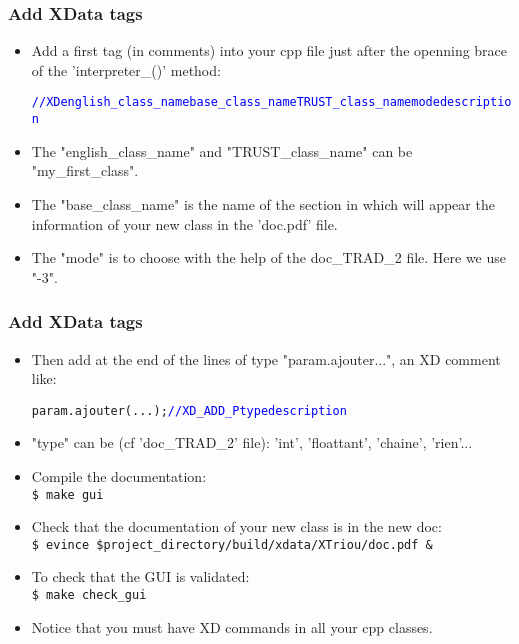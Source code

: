 \documentclass[10pt, hyperref={unicode=true,pdfusetitle, bookmarks=true,bookmarksnumbered=false,bookmarksopen=false, breaklinks=false,pdfborder={0 0 1},backref=true,colorlinks=true,linkcolor=darkblue,pageanchor, urlcolor=darkblue}]{beamer}
\begin{document}
\begin{frame}
\frametitle{Add XData tags}
\begin{block}{}

\begin{itemize}
\item Add a first tag (in comments) into your cpp file just after the openning brace of the 'interpreter\_()' method:\\
\begin{alltt}
\textcolor{blue}{// XD english\_class\_name base\_class\_name TRUST\_class\_name mode description}
\end{alltt}
\item The "english\_class\_name" and "TRUST\_class\_name" can be "my\_first\_class".
\item The "base\_class\_name" is the name of the section in which will appear the information of your new class in the 'doc.pdf' file.
\item The "mode" is to choose with the help of the doc\_TRAD\_2 file. Here we use "-3".
\end{itemize}

\end{block}
\end{frame}
\begin{frame}
\frametitle{Add XData tags}
\begin{block}{}

\begin{itemize}
\item Then add at the end of the lines of type "param.ajouter...", an XD comment like:\\
\begin{alltt}
param.ajouter(...);  \textcolor{blue}{// XD\_ADD\_P type description}
\end{alltt}
\item "type" can be (cf 'doc\_TRAD\_2' file): 'int', 'floattant', 'chaine', 'rien'...
\item Compile the documentation:\\
\texttt{\$ make gui}
\item Check that the documentation of your new class is in the new doc:\\
\texttt{\$ evince \$project\_directory/build/xdata/XTriou/doc.pdf \&}
\item To check that the GUI is validated:\\
\texttt{\$ make check\_gui}
\item Notice that you must have XD commands in all your cpp classes.
\end{itemize}

\end{block}
\end{frame}
\end{document}
